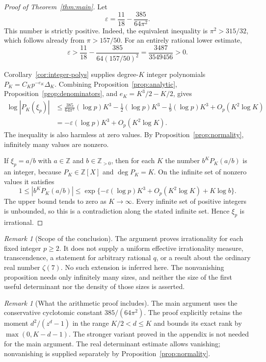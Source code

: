 \documentclass[11pt,letterpaper]{article}
\numberwithin{equation}{section}
\theoremstyle{remark}
\newtheorem{remark}[theorem]{Remark}
\newcommand{\Z}{\mathbb Z}
\newcommand{\eps}{\varepsilon}
\begin{document}
\begin{proof}[Proof of Theorem~\ref{thm:main}]
Let
\begin{equation*}
 \eps=\frac{11}{18}-\frac{385}{64\pi^2}.
\end{equation*}
This number is strictly positive. Indeed, the equivalent inequality is $\pi^2>315/32$, which follows already from $\pi>157/50$. For an entirely rational lower estimate,
\begin{equation*}
 \eps>
 \frac{11}{18}-\frac{385}{64(157/50)^2}
 =\frac{3487}{3549456}>0.
\end{equation*}

Corollary~\ref{cor:integer-polys} supplies degree-$K$ integer polynomials $P_K=C_Kp^{-e_K}\Delta_K$. Combining Proposition~\ref{prop:analytic}, Proposition~\ref{prop:denominators}, and $e_K=K^3/2-K/2$, gives
\begin{align*}
 \log|P_K(\xi_p)|
 &\le\frac{385}{64\pi^2}(\log p)K^3
       -\frac12(\log p)K^3-\frac19(\log p)K^3
       +O_p(K^2\log K)\\
 &=-\eps(\log p)K^3+O_p(K^2\log K).
\end{align*}
The inequality is also harmless at zero values. By Proposition~\ref{prop:normality}, infinitely many values are nonzero.

If $\xi_p=a/b$ with $a\in\Z$ and $b\in\Z_{>0}$, then for each $K$ the number $b^KP_K(a/b)$ is an integer, because $P_K\in\Z[X]$ and $\deg P_K=K$. On the infinite set of nonzero values it satisfies
\begin{equation*}
 1\le |b^KP_K(a/b)|
 \le\exp\{-\eps(\log p)K^3+O_p(K^2\log K)+K\log b\}.
\end{equation*}
The upper bound tends to zero as $K\to\infty$. Every infinite set of positive integers is unbounded, so this is a contradiction along the stated infinite set. Hence $\xi_p$ is irrational.
\end{proof}

\begin{remark}[Scope of the conclusion]
The argument proves irrationality for each fixed integer $p\ge2$. It does not supply a uniform effective irrationality measure, transcendence, a statement for arbitrary rational $q$, or a result about the ordinary real number $\zeta(7)$. No such extension is inferred here. The nonvanishing proposition needs only infinitely many sizes, and neither the size of the first useful determinant nor the density of those sizes is asserted.
\end{remark}

\begin{remark}[What the arithmetic proof includes]
The main argument uses the conservative cyclotomic constant $385/(64\pi^2)$. The proof explicitly retains the moment $d^2/(z^d-1)$ in the range $K/2<d\le K$ and bounds its exact rank by $\max(0,K-d-1)$. The stronger variant proved in the appendix is not needed for the main argument. The real determinant estimate allows vanishing; nonvanishing is supplied separately by Proposition~\ref{prop:normality}.
\end{remark}
\end{document}
